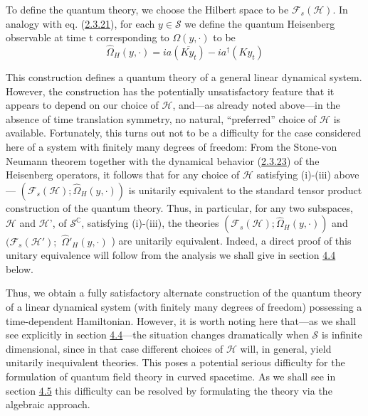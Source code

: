 \documentclass[11pt,a4paper]{article}
\begin{document}
To define the quantum theory, we choose the Hilbert space to be \(\mathcal{F}_s(\mathcal{H})\). In analogy with eq. (\hyperref[eq:2.3.21]{2.3.21}), for each \(y \in \mathcal{S}\) we define the quantum Heisenberg observable at time t corresponding to \(\Omega(y, \cdot)\) to be
\begin{equation*}
\widehat{\Omega}_{H}(y,\cdot) = ia(\overline{Ky_t}) - ia^{\dagger}(Ky_t) \tag{2.3.23}\label{eq:2.3.23}
\end{equation*}

This construction defines a quantum theory of a general linear dynamical system. However, the construction has the potentially unsatisfactory feature that it appears to depend on our choice of \(\mathcal{H}\), and---as already noted above---in the absence of time translation symmetry, no natural, ``preferred'' choice of \(\mathcal{H}\) is available. Fortunately, this turns out not to be a difficulty for the case considered here of a system with finitely many degrees of freedom: From the Stone-von Neumann theorem together with the dynamical behavior (\hyperref[eq:2.3.23]{2.3.23}) of the Heisenberg operators, it follows that for any choice of \(\mathcal{H}\) satisfying (i)-(iii) above--- \((\mathcal{F}_s(\mathcal{H}); \widehat{\Omega}_H(y,\cdot))\) is unitarily equivalent to the standard tensor product construction of the quantum theory. Thus, in particular, for any two subspaces, \(\mathcal{H}\) and \(\mathcal{H}\)', of \(\mathcal{S}^{\mathbb{C}}\), satisfying (i)-(iii), the theories \((\mathcal{F}_{s}(\mathcal{H}); \widehat{\Omega}_{H}(y,\cdot))\) and \((\mathcal{F}_{s}(\mathcal{H}');\) \(\hat{\Omega}'_{H}(y,\cdot)\) ) are unitarily equivalent. Indeed, a direct proof of this unitary equivalence will follow from the analysis we shall give in section \hyperlink{sec:4.4}{4.4} below.

Thus, we obtain a fully satisfactory alternate construction of \hypertarget{source-42}{} the quantum theory of a linear dynamical system (with finitely many degrees of freedom) possessing a time-dependent Hamiltonian. However, it is worth noting here that---as we shall see explicitly in section \hyperlink{sec:4.4}{4.4}---the situation changes dramatically when \(\mathcal{S}\) is infinite dimensional, since in that case different choices of \(\mathcal{H}\) will, in general, yield unitarily inequivalent theories. This poses a potential serious difficulty for the formulation of quantum field theory in curved spacetime. As we shall see in section \hyperlink{sec:4.5}{4.5} this difficulty can be resolved by formulating the theory via the algebraic approach.
\end{document}

